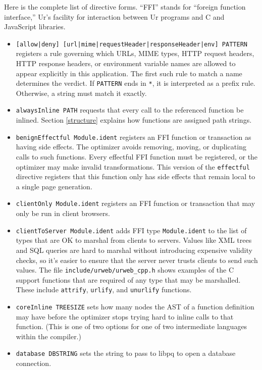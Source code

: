 \documentclass{article}
\begin{document}
Here is the complete list of directive forms.  ``FFI'' stands for ``foreign function interface,'' Ur's facility for interaction between Ur programs and C and JavaScript libraries.
\begin{itemize}
\item \texttt{[allow|deny] [url|mime|requestHeader|responseHeader|env] PATTERN} registers a rule governing which URLs, MIME types, HTTP request headers, HTTP response headers, or environment variable names are allowed to appear explicitly in this application.  The first such rule to match a name determines the verdict.  If \texttt{PATTERN} ends in \texttt{*}, it is interpreted as a prefix rule.  Otherwise, a string must match it exactly.
\item \texttt{alwaysInline PATH} requests that every call to the referenced function be inlined.  Section \ref{structure} explains how functions are assigned path strings.
\item \texttt{benignEffectful Module.ident} registers an FFI function or transaction as having side effects.  The optimizer avoids removing, moving, or duplicating calls to such functions.  Every effectful FFI function must be registered, or the optimizer may make invalid transformations.  This version of the \texttt{effectful} directive registers that this function only has side effects that remain local to a single page generation.
\item \texttt{clientOnly Module.ident} registers an FFI function or transaction that may only be run in client browsers.
\item \texttt{clientToServer Module.ident} adds FFI type \texttt{Module.ident} to the list of types that are OK to marshal from clients to servers.  Values like XML trees and SQL queries are hard to marshal without introducing expensive validity checks, so it's easier to ensure that the server never trusts clients to send such values.  The file \texttt{include/urweb/urweb\_cpp.h} shows examples of the C support functions that are required of any type that may be marshalled.  These include \texttt{attrify}, \texttt{urlify}, and \texttt{unurlify} functions.
\item \texttt{coreInline TREESIZE} sets how many nodes the AST of a function definition may have before the optimizer stops trying hard to inline calls to that function.  (This is one of two options for one of two intermediate languages within the compiler.)
\item \texttt{database DBSTRING} sets the string to pass to libpq to open a database connection.

\end{itemize}
\end{document}
